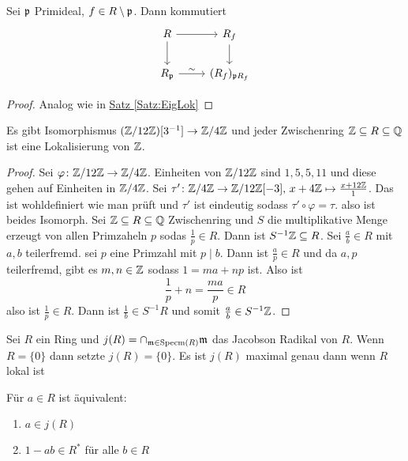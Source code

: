 \begin{Satz}
    Sei $\mathfrak{p}$ Primideal, $f\in R\setminus \mathfrak{p}$. 
    Dann kommutiert 
    $$%
\begin{tikzcd}
R \arrow[r] \arrow[d]      & R_f \arrow[d]      \\
R_\frakp \arrow[r, "\sim"] & (R_f)_{\frakp R_f}
\end{tikzcd}$$
\end{Satz}
\begin{proof}
    Analog wie in \hyperref[Satz:EigLok]{Satz \ref{Satz:EigLok}}
\end{proof}
\begin{Bsp}
    Es gibt Isomorphismus $(\mathbb{Z}/12\mathbb{Z})[3^{-1}]\to \mathbb{Z}/4\mathbb{Z}$ und jeder Zwischenring $\mathbb{Z}\subseteq R\subseteq \mathbb{Q}$ ist eine Lokalisierung von $\mathbb{Z}$.
\end{Bsp}
\begin{proof}
    Sei $\varphi\colon \mathbb{Z}/12\mathbb{Z}\to \mathbb{Z}/4\mathbb{Z} $. Einheiten von $\mathbb{Z}/12\mathbb{Z}$ sind $1,5,5,11$ und diese gehen auf Einheiten in $\mathbb{Z}/4\mathbb{Z}$.
    Sei $\tau'\colon \mathbb{Z}/4\mathbb{Z}\to \mathbb{Z}/12\mathbb{Z}[-3],\, x+4\mathbb{Z}\mapsto \frac{x+12\mathbb{Z}}{1}$. Das ist wohldefiniert wie man prüft und $\tau'$ ist eindeutig sodass $\tau'\circ\varphi=\tau.$ also ist beides Isomorph.
    Sei $\mathbb{Z}\subseteq R\subseteq \mathbb{Q}$ Zwischenring und $S$ die multiplikative Menge erzeugt von allen Primzaheln $p$ sodas $\frac 1 p\in R$. Dann ist $S^{-1}\mathbb{Z}\subseteq R$. Sei $\frac a b\in R$ mit $a,b$ teilerfremd. sei $p$ eine Primzahl mit $p\mid b$. Dann ist $\frac a p\in R$ und da $a,p$ teilerfremd, gibt es $m,n\in\mathbb{Z}$ sodass $1=ma+np$ ist. Also ist $$\frac 1 p+n=\frac{ma}{p}\in R$$ also ist $\frac 1 p\in R$. Dann ist $\frac 1 b\in S^{-1}R$ und somit $\frac a b\in S^{-1}\mathbb{Z}$.
\end{proof}
\begin{Def}
    Sei $R$ ein Ring und $j(R)=\cap_{\mathfrak{m}\in\operatorname{Specm}(R)}\mathfrak{m}$ das Jacobson Radikal von $R$. 
    Wenn $R=\{0\}$ dann setzte $j(R)=\{0\}$.
    Es ist $j(R)$ maximal genau dann wenn $R$ lokal ist
\end{Def}
\begin{Bem}
    Für $a\in R$ ist äquivalent:
    \begin{enumerate}
        \item $a\in j(R)$
        \item $1-ab\in R^*$ für alle $b\in R$
    \end{enumerate}
\end{Bem}
